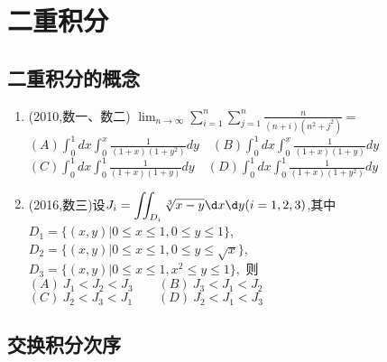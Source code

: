 \documentclass[12pt, a4paper, oneside, UTF8]{ctexbook}
\begin{document}

\else
\fi

\chapter{二重积分}
\section{二重积分的概念}

\begin{enumerate}[label=\arabic*.]
    \item (2010,数一、数二) 
    $\displaystyle\lim_{n\rightarrow\infty}\sum_{i=1}^n\sum_{j=1}^n\frac{n}{(n+i)(n^2+j^2)}=$ \\
    $\displaystyle(A)\int_0^1 dx\int_0^x\frac{1}{(1+x)(1+y^2)}dy \quad (B)\int_0^1 dx\int_0^x\frac{1}{(1+x)(1+y)}dy$ \\
    $\displaystyle(C)\int_0^1 dx\int_0^1\frac{1}{(1+x)(1+y)}dy \quad (D)\int_0^1 dx\int_0^1\frac{1}{(1+x)(1+y^2)}dy$
    
    \begin{solution}
    \newpage
    \end{solution}
    
    \item (2016,数三)设$\displaystyle J_i=\iint_{D_i}\sqrt[3]{x-y}\d x\d y(i=1,2,3)$,其中 \\
        $D_1=\{(x,y)|0\leq x\leq 1,0\leq y\leq 1\}$, \\
        $D_2=\{(x,y)|0\leq x\leq 1,0\leq y\leq \sqrt{x}\}$, \\
        $D_3=\{(x,y)|0\leq x\leq 1,x^2\leq y\leq 1\},$
    则 \\
    $(A)\ J_1<J_2<J_3 \qquad (B)\ J_3<J_1<J_2$ \\
    $(C)\ J_2<J_3<J_1 \qquad (D)\ J_2<J_1<J_3$
    
    \begin{solution}
    \newpage
    \end{solution}
\end{enumerate}

\section{交换积分次序}
\end{document}
